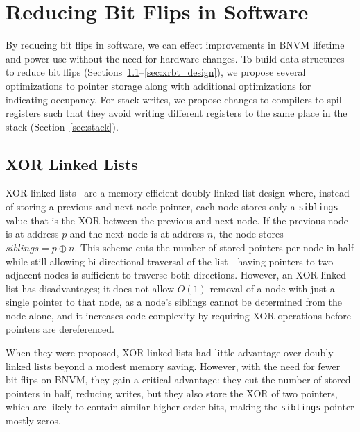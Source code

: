 \section{Reducing Bit Flips in Software}
\label{sec:datastruct}

By reducing bit flips in software, we can effect improvements in BNVM lifetime
and power use without the need for hardware changes.
To build data structures to reduce bit
flips (Sections~\ref{sec:xorll_design}--\ref{sec:xrbt_design}), we propose
several optimizations to pointer storage along with additional optimizations for
indicating occupancy. For stack writes, we propose changes to compilers
to spill registers such that they avoid writing different registers to the same
place in the stack (Section~\ref{sec:stack}).

\subsection{XOR Linked Lists}
\label{sec:xorll_design}

XOR linked lists~\cite{xorll} are a memory-efficient doubly-linked list design
where, instead of storing a previous and next node pointer, each node stores
only a \texttt{siblings} value that is the XOR between the previous and next
node. If the previous node is at address $p$ and the next node is
at address $n$, the node stores $siblings = p \oplus n$. This scheme cuts the
number of stored pointers per node in half while still allowing bi-directional
traversal of the list---having pointers to two adjacent nodes is sufficient to
traverse both directions. However, an XOR linked list has
disadvantages; it does not allow $O(1)$ removal of a node with just a
single pointer to that node, as a node's siblings cannot be determined from the
node alone, and it increases code complexity by requiring XOR operations before
pointers are dereferenced.

When they were proposed, XOR linked lists had little advantage over doubly linked lists beyond
a modest memory saving.
However, with the need for fewer bit flips on BNVM, they gain a critical
advantage: they cut the number of stored pointers in half, reducing writes, but
they also store the XOR of two pointers, which are likely to contain similar
higher-order bits, making the \texttt{siblings} pointer mostly zeros.

